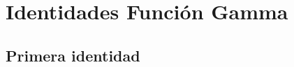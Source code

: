 \documentclass[12pt]{beamer}
\begin{document}


\section{Identidades Función Gamma}
\subsection{Primera identidad}
\end{document}
